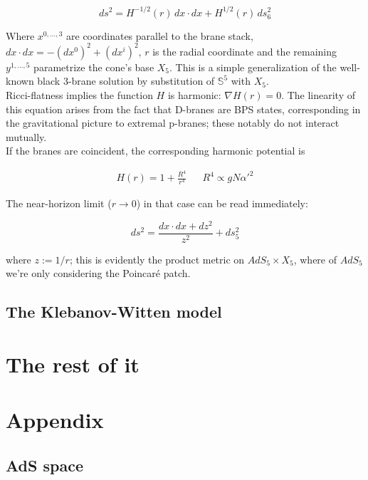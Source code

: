 \documentclass[11pt,a4paper,twoside,openright]{book}
\begin{document}
\begin{equation}
ds^2 = H^{-1/2}(r) \, dx\cdot dx + H^{1/2}(r) \, ds_6^2
\end{equation}

Where $x^{0,\ldots,3}$ are coordinates parallel to the brane stack, $dx\cdot dx = -(dx^0)^2 + (dx^i)^2$, $r$ is the radial coordinate and the remaining $y^{1,\ldots,5}$ parametrize the cone's base $X_5$. This is a simple generalization of the well-known black 3-brane solution by substitution of $\mathbb{S}^5$ with $X_5$.\\

Ricci-flatness implies the function $H$ is harmonic: $\nabla H(r) = 0$. The linearity of this equation arises from the fact that D-branes are BPS states, corresponding in the gravitational picture to extremal p-branes; these notably do not interact mutually.\\

If the branes are coincident, the corresponding harmonic potential is

\begin{align}
 H(r) = 1 + \frac{R^4}{r^4} && R^4 \propto g N \alpha'^2 
\end{align}

The near-horizon limit ($r\rightarrow 0$) in that case can be read immediately:

\begin{equation}
ds^2 = \frac{ dx \cdot dx + dz^2}{z^2} + ds_5^2
\end{equation}

where $z := 1/r$; this is evidently the product metric on $AdS_5 \times X_5$, where of $AdS_5$ we're only considering the Poincaré patch. 

\section{The Klebanov-Witten model}




\chapter{The rest of it}

\appendix

\chapter{Appendix}

\section{AdS space}
\end{document}
